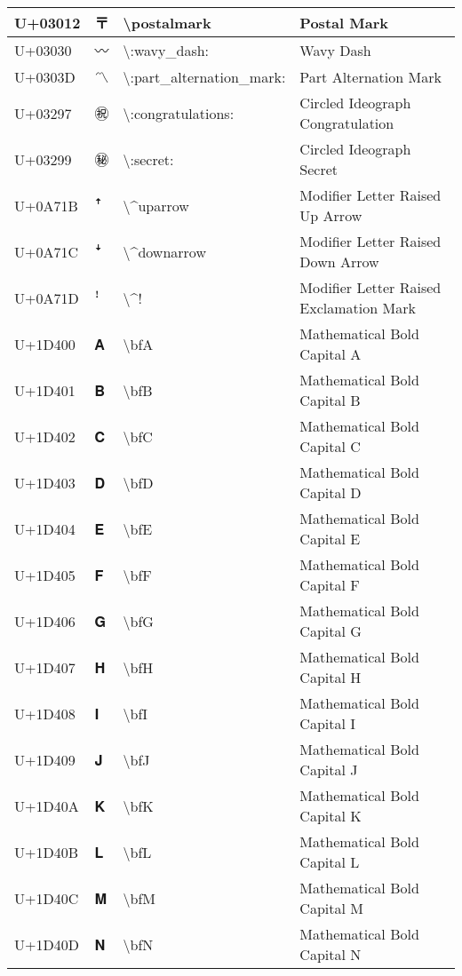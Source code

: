 \begin{table}[h]
\begin{tabulary}{\linewidth}{|L|L|L|L|}
\hline
U+03012 & 〒 & {\textbackslash}postalmark & Postal Mark \\
\hline
U+03030 & 〰 & {\textbackslash}:wavy\_dash: & Wavy Dash \\
\hline
U+0303D & 〽 & {\textbackslash}:part\_alternation\_mark: & Part Alternation Mark \\
\hline
U+03297 & ㊗ & {\textbackslash}:congratulations: & Circled Ideograph Congratulation \\
\hline
U+03299 & ㊙ & {\textbackslash}:secret: & Circled Ideograph Secret \\
\hline
U+0A71B & ꜛ & {\textbackslash}{\textasciicircum}uparrow & Modifier Letter Raised Up Arrow \\
\hline
U+0A71C & ꜜ & {\textbackslash}{\textasciicircum}downarrow & Modifier Letter Raised Down Arrow \\
\hline
U+0A71D & ꜝ & {\textbackslash}{\textasciicircum}! & Modifier Letter Raised Exclamation Mark \\
\hline
U+1D400 & 𝐀 & {\textbackslash}bfA & Mathematical Bold Capital A \\
\hline
U+1D401 & 𝐁 & {\textbackslash}bfB & Mathematical Bold Capital B \\
\hline
U+1D402 & 𝐂 & {\textbackslash}bfC & Mathematical Bold Capital C \\
\hline
U+1D403 & 𝐃 & {\textbackslash}bfD & Mathematical Bold Capital D \\
\hline
U+1D404 & 𝐄 & {\textbackslash}bfE & Mathematical Bold Capital E \\
\hline
U+1D405 & 𝐅 & {\textbackslash}bfF & Mathematical Bold Capital F \\
\hline
U+1D406 & 𝐆 & {\textbackslash}bfG & Mathematical Bold Capital G \\
\hline
U+1D407 & 𝐇 & {\textbackslash}bfH & Mathematical Bold Capital H \\
\hline
U+1D408 & 𝐈 & {\textbackslash}bfI & Mathematical Bold Capital I \\
\hline
U+1D409 & 𝐉 & {\textbackslash}bfJ & Mathematical Bold Capital J \\
\hline
U+1D40A & 𝐊 & {\textbackslash}bfK & Mathematical Bold Capital K \\
\hline
U+1D40B & 𝐋 & {\textbackslash}bfL & Mathematical Bold Capital L \\
\hline
U+1D40C & 𝐌 & {\textbackslash}bfM & Mathematical Bold Capital M \\
\hline
U+1D40D & 𝐍 & {\textbackslash}bfN & Mathematical Bold Capital N \\

\end{tabulary}
\end{table}
